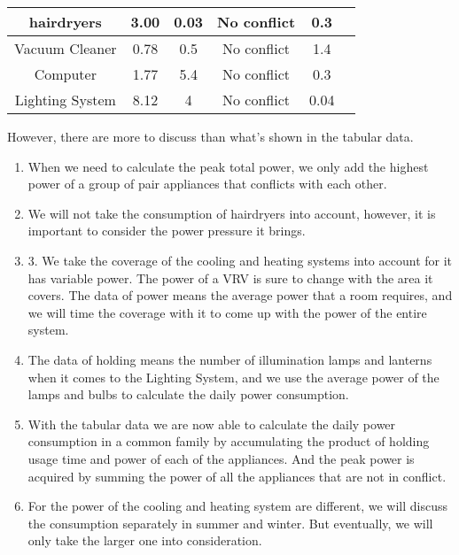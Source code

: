 \documentclass[12pt]{article}
\begin{document}
\begin{center}
\begin{tabular}{|c | c |c | c |c  |c|}
        hairdryers      & 3.00                        & 0.03                     & No conflict             & 0.3   \\ \hline
        Vacuum Cleaner  & 0.78                        & 0.5                      & No conflict             & 1.4   \\ \hline
        Computer        & 1.77                        & 5.4                      & No conflict             & 0.3   \\\hline
        Lighting System & 8.12                        & 4                        & No conflict             & 0.04  \\ \hline
    \end{tabular}
\end{center}


However, there are more to discuss than what's shown in the tabular data.
\begin{enumerate}
    \item When we need to calculate the peak total power, we only add the highest power of a group of pair appliances that conflicts with each other.
    \item We will not take the consumption of hairdryers into account, however, it is important to consider the power pressure it brings.
    \item 3.	We take the coverage of the cooling and heating systems into account for it has variable power. The power of a VRV is sure to change with the area it covers.
          The data of power means the average power that a room requires, and we will time the coverage with it to come up with the power of the entire system.
    \item The data of holding means the number of illumination lamps and lanterns when it comes to the Lighting System, and we use the average power of the lamps and bulbs to calculate
          the daily power consumption.
    \item With the tabular data we are now able to calculate the daily power consumption in a common family by accumulating the product of holding usage time and power of each of the
          appliances. And the peak power is acquired by summing the power of all the appliances that are not in conflict.
    \item For the power of the cooling and heating system are different, we will discuss the consumption separately in summer and winter. But eventually, we will only take the larger
          one into consideration.
\end{enumerate}
\end{document}
